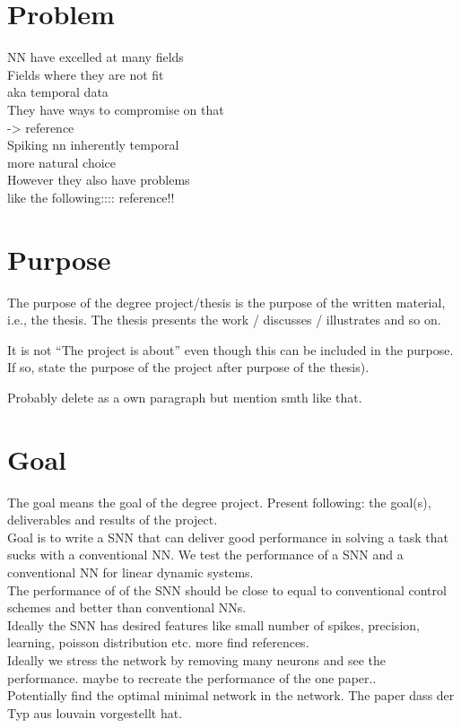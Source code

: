 \section{Problem}
NN have excelled at many fields\\
Fields where they are not fit\\ aka temporal data\\
They have ways to compromise on that \\ -> reference\\
Spiking nn inherently temporal \\
more natural choice\\
However they also have problems\\
like the following:::: reference!!\\
\section{Purpose}
The purpose of the degree project/thesis is the purpose of the written material, i.e., the thesis. The thesis presents the work / discusses / illustrates and so on.

It is not “The project is about” even though this can be included in the purpose. If so, state the purpose of the project after purpose of the thesis).

Probably delete as a own paragraph but mention smth like that.

\section{Goal}
The goal means the goal of the degree project. Present following: the goal(s), deliverables and results of the project.\\
Goal is to write a SNN that can deliver good performance in solving a task that sucks with a conventional NN.
We test the performance of a SNN and a conventional NN for linear dynamic systems.\\
The performance of of the SNN should be close to equal to conventional control schemes and better than conventional NNs.\\
Ideally the SNN has desired features like small number of spikes, precision, learning, poisson distribution etc. more find references.\\
Ideally we stress the network by removing many neurons and see the performance. maybe to recreate the performance of the one paper.. \\
Potentially find the optimal minimal network in the network. The paper dass der Typ aus louvain vorgestellt hat.
